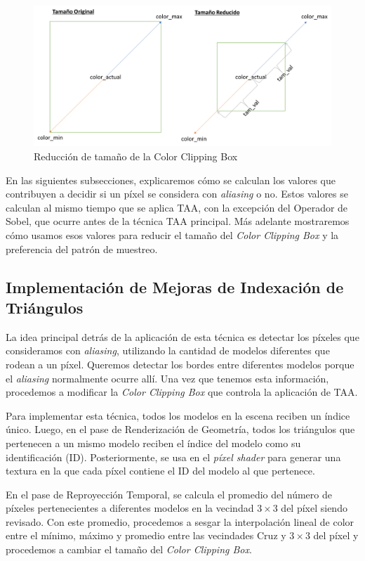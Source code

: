 \documentclass[pregrado]{tesis-usb} %
\begin{document}
\begin{figure}[!hbt]
	\centering
	\includegraphics[scale=0.3]{images/clipping_box_reduction.png}
	\caption{Reducción de tamaño de la Color Clipping Box}\label{fig:colorclippingboxredux}
\end{figure}

En las siguientes subsecciones, explicaremos cómo se calculan los valores que contribuyen a decidir si un píxel se considera con \textit{aliasing} o no. Estos valores se calculan al mismo tiempo que se aplica TAA, con la excepción del Operador de Sobel, que ocurre antes de la técnica TAA principal. Más adelante mostraremos cómo usamos esos valores para reducir el tamaño del \textit{Color Clipping Box} y la preferencia del patrón de muestreo.

\subsection{Implementación de Mejoras de Indexación de Triángulos}
La idea principal detrás de la aplicación de esta técnica es detectar los píxeles que consideramos con \textit{aliasing}, utilizando la cantidad de modelos diferentes que rodean a un píxel. Queremos detectar los bordes entre diferentes modelos porque el \textit{aliasing} normalmente ocurre allí. Una vez que tenemos esta información, procedemos a modificar la \textit{Color Clipping Box} que controla la aplicación de TAA.

Para implementar esta técnica, todos los modelos en la escena reciben un índice único. Luego, en el pase de Renderización de Geometría, todos los triángulos que pertenecen a un mismo modelo reciben el índice del modelo como su identificación (ID). Posteriormente, se usa en el \textit{píxel shader} para generar una textura en la que cada píxel contiene el ID del modelo al que pertenece.

En el pase de Reproyección Temporal, se calcula el promedio del número de píxeles pertenecientes a diferentes modelos en la vecindad $3\times 3$ del píxel siendo revisado. Con este promedio, procedemos a sesgar la interpolación lineal de color entre el mínimo, máximo y promedio entre las vecindades Cruz y $3\times 3$ del píxel y procedemos a cambiar el tamaño del \textit{Color Clipping Box}.
\end{document}
